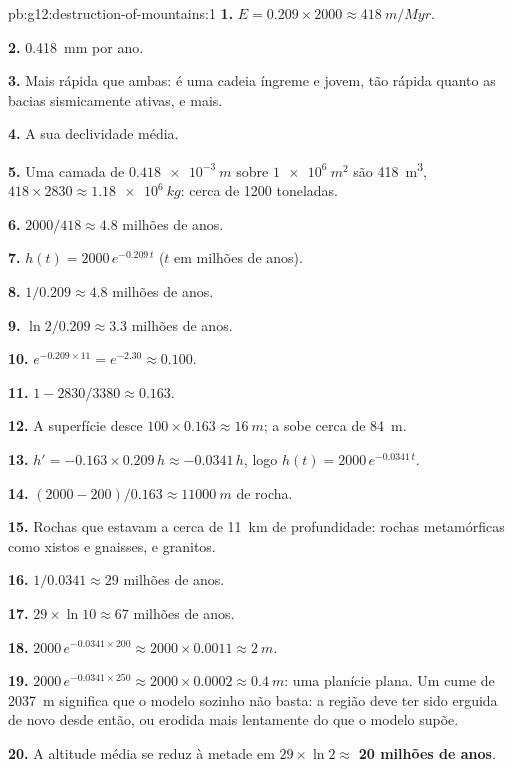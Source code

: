 \begin{solution}{pb:g12:destruction-of-mountains:1}
\textbf{1.} $E = 0.209 \times 2000 \approx \qty{418}{m/Myr}$.

\textbf{2.} \qty{0.418}{mm} por ano.

\textbf{3.} Mais rápida que ambas: é uma cadeia íngreme e jovem, tão rápida
quanto as bacias sismicamente ativas, e mais.

\textbf{4.} A sua declividade média.

\textbf{5.} Uma camada de $\qty{0.418e-3}{m}$ sobre $\qty{1e6}{m^2}$ são
\qty{418}{m^3}, $418 \times 2830 \approx \qty{1.18e6}{kg}$: cerca de 1200
toneladas.

\textbf{6.} $2000/418 \approx 4.8$ milhões de anos.

\textbf{7.} $h(t) = 2000\,e^{-0.209\,t}$ ($t$ em milhões de anos).

\textbf{8.} $1/0.209 \approx 4.8$ milhões de anos.

\textbf{9.} $\ln 2/0.209 \approx 3.3$ milhões de anos.

\textbf{10.} $e^{-0.209 \times 11} = e^{-2.30} \approx 0.100$.

\textbf{11.} $1 - 2830/3380 \approx 0.163$.

\textbf{12.} A superfície desce $100 \times 0.163 \approx \qty{16}{m}$; a
 sobe cerca de \qty{84}{m}.

\textbf{13.} $h' = -0.163 \times 0.209\,h \approx -0.0341\,h$, logo $h(t) =
2000\,e^{-0.0341\,t}$.

\textbf{14.} $(2000 - 200)/0.163 \approx \qty{11000}{m}$ de rocha.

\textbf{15.} Rochas que estavam a cerca de \qty{11}{km} de profundidade:
rochas metamórficas como xistos e gnaisses, e granitos.

\textbf{16.} $1/0.0341 \approx 29$ milhões de anos.

\textbf{17.} $29 \times \ln 10 \approx 67$ milhões de anos.

\textbf{18.} $2000\,e^{-0.0341 \times 200} \approx 2000 \times 0.0011 \approx
\qty{2}{m}$.

\textbf{19.} $2000\,e^{-0.0341 \times 250} \approx 2000 \times 0.0002 \approx
\qty{0.4}{m}$: uma planície plana. Um cume de \qty{2037}{m} significa que o
modelo sozinho não basta: a região deve ter sido erguida de novo desde
então, ou erodida mais lentamente do que o modelo supõe.

\textbf{20.} A altitude média se reduz à metade em $29 \times \ln 2 \approx$
\textbf{20 milhões de anos}.
\end{solution}
